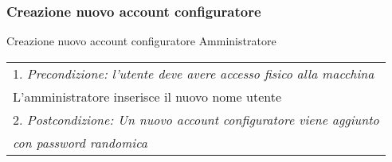 \begin{minipage}{\textwidth}
    \subsubsection{Creazione nuovo account configuratore}
    \usecase
        {Creazione nuovo account configuratore}
        {Amministratore}
        {
            \begin{tabular}{l}
                1. \textit{Precondizione: l'utente deve avere accesso fisico alla macchina}\\
                L'amministratore inserisce il nuovo nome utente\\
                2. \textit{Postcondizione: Un nuovo account configuratore viene aggiunto} \\
                \textit{con password randomica}
            \end{tabular} \\
        }
        \vspace{0.5cm}
\end{minipage}